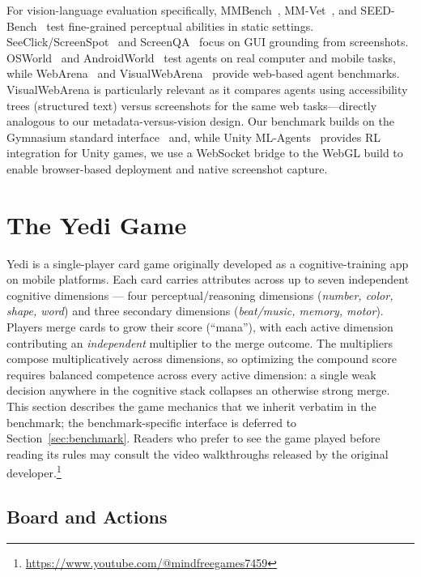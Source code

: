 \documentclass[11pt]{article}
\begin{document}
For vision-language evaluation specifically, MMBench~\citep{liu2024mmbench},
MM-Vet~\citep{yu2024mmvet}, and SEED-Bench~\citep{li2024seedbench} test
fine-grained perceptual abilities in static settings.
SeeClick/ScreenSpot~\citep{cheng2024seeclick} and
ScreenQA~\citep{hsiao2025screenqa} focus on GUI grounding from screenshots.
OSWorld~\citep{xie2024osworld} and AndroidWorld~\citep{rawles2025androidworld}
test agents on real computer and mobile tasks, while
WebArena~\citep{zhou2024webarena} and
VisualWebArena~\citep{koh2024visualwebarena} provide web-based agent
benchmarks. VisualWebArena is particularly relevant as it compares agents
using accessibility trees (structured text) versus screenshots for the same
web tasks---directly analogous to our metadata-versus-vision design.
Our benchmark builds on the Gymnasium standard
interface~\citep{towers2024gymnasium} and, while Unity
ML-Agents~\citep{juliani2018unityml} provides RL integration for Unity games,
we use a WebSocket bridge to the WebGL build to enable browser-based deployment
and native screenshot capture.


\section{The Yedi Game}
\label{sec:game}

Yedi is a single-player card game originally developed as a cognitive-training
app on mobile platforms. Each card carries attributes across up to seven
independent cognitive dimensions --- four perceptual/reasoning dimensions
(\emph{number, color, shape, word}) and three secondary dimensions
(\emph{beat/music, memory, motor}). Players merge cards to grow their score
(``mana''), with each active dimension contributing an \emph{independent}
multiplier to the merge outcome. The multipliers compose multiplicatively
across dimensions, so optimizing the compound score requires balanced
competence across every active dimension: a single weak decision anywhere in
the cognitive stack collapses an otherwise strong merge. This section
describes the game mechanics that we inherit verbatim in the benchmark; the
benchmark-specific interface is deferred to Section~\ref{sec:benchmark}.
Readers who prefer to see the game played before reading its rules may
consult the video walkthroughs released by the original
developer.\footnote{\url{https://www.youtube.com/@mindfreegames7459}}

\subsection{Board and Actions}
\label{sec:board}
\end{document}
